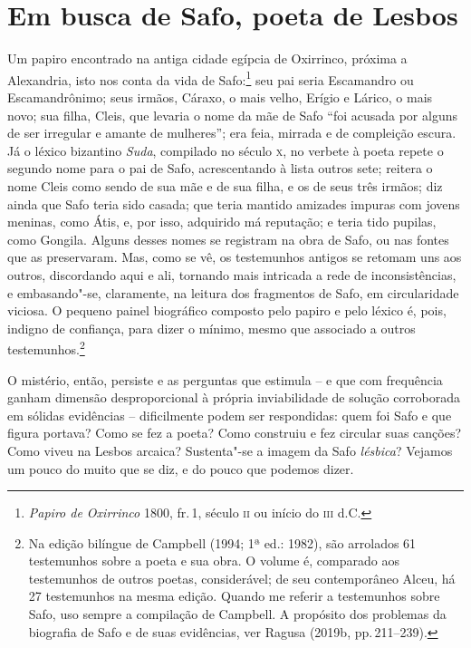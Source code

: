 \section*{Em busca de Safo, poeta de Lesbos}

Um papiro encontrado na antiga cidade egípcia de Oxirrinco, próxima a
Alexandria, isto nos conta da vida de Safo:\footnote{\textit{Papiro de Oxirrinco} 1800,
fr.\,1, século \textsc{ii} ou início do \textsc{iii} d.C.} seu pai seria Escamandro ou
Escamandrônimo; seus irmãos, Cáraxo, o mais velho, Erígio e Lárico, o mais
novo; sua filha, Cleis, que levaria o nome da mãe de Safo ``foi acusada
por alguns de ser irregular e amante de mulheres”; era feia, mirrada e de
compleição escura. Já o léxico bizantino \textit{Suda}, compilado no século \textsc{x},
no verbete à poeta repete o segundo nome para o pai de Safo, acrescentando à
lista outros sete; reitera o nome Cleis como sendo de sua mãe e de sua filha, e
os de seus três irmãos; diz ainda que Safo teria sido casada; que teria mantido
amizades impuras com jovens meninas, como Átis, e, por isso, adquirido má
reputação; e teria tido pupilas, como Gongila. Alguns desses nomes se registram
na obra de Safo, ou nas fontes que as preservaram. Mas, como se vê, os
testemunhos antigos se retomam uns aos outros, discordando aqui e ali, tornando
mais intricada a rede de inconsistências, e embasando"-se, claramente, na
leitura dos fragmentos de Safo, em circularidade viciosa. O pequeno painel
biográfico composto pelo papiro e pelo léxico é, pois, indigno de confiança,
para dizer o mínimo, mesmo que associado a outros testemunhos.\footnote{ Na
edição bilíngue de Campbell (1994; 1ª ed.: 1982), são arrolados 61 testemunhos
sobre a poeta e sua obra. O volume é, \mbox{comparado} aos testemunhos de outros
poetas, considerável; de seu contemporâneo Alceu, há 27 testemunhos na mesma edição. 
Quando me referir a testemunhos sobre Safo, uso
sempre a compilação de Campbell. A propósito dos problemas da biografia de Safo e de suas evidências, ver Ragusa (2019b, pp.\,211--239).}

O mistério, então, persiste e as perguntas que estimula -- e que com frequência
ganham dimensão desproporcional à própria inviabilidade de solução
corroborada em sólidas evidências -- dificilmente podem ser respondidas: quem
foi Safo e que figura portava? Como se fez a poeta? Como construiu e fez
circular suas canções? Como viveu na Lesbos arcaica? Sustenta"-se a imagem da
Safo \textit{lésbica}? Vejamos um pouco do muito que se diz, e do
pouco que podemos dizer.

